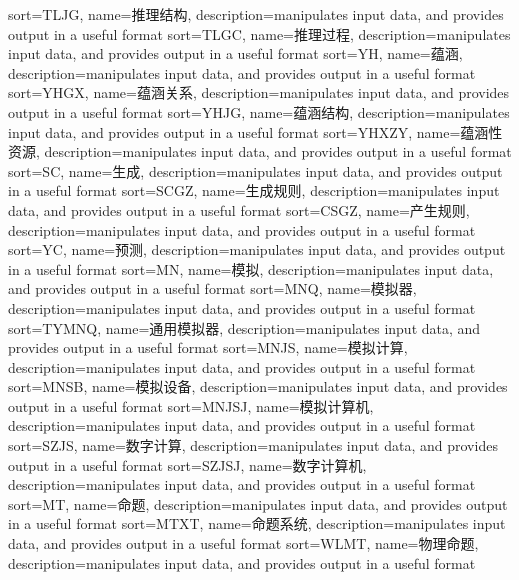 {
  sort=TLJG,
  name=推理结构,
  description={manipulates input data, and provides output in a useful format}
}
{
  sort=TLGC,
  name=推理过程,
  description={manipulates input data, and provides output in a useful format}
}
{
  sort=YH,
  name=蕴涵,
  description={manipulates input data, and provides output in a useful format}
}
{
  sort=YHGX,
  name=蕴涵关系,
  description={manipulates input data, and provides output in a useful format}
}
{
  sort=YHJG,
  name=蕴涵结构,
  description={manipulates input data, and provides output in a useful format}
}
{
  sort=YHXZY,
  name=蕴涵性资源,
  description={manipulates input data, and provides output in a useful format}
}
{
  sort=SC,
  name=生成,
  description={manipulates input data, and provides output in a useful format}
}
{
  sort=SCGZ,
  name=生成规则,
  description={manipulates input data, and provides output in a useful format}
}
{
  sort=CSGZ,
  name=产生规则,
  description={manipulates input data, and provides output in a useful format}
}
{
  sort=YC,
  name=预测,
  description={manipulates input data, and provides output in a useful format}
}
{
  sort=MN,
  name=模拟,
  description={manipulates input data, and provides output in a useful format}
}
{
  sort=MNQ,
  name=模拟器,
  description={manipulates input data, and provides output in a useful format}
}
{
  sort=TYMNQ,
  name=通用模拟器,
  description={manipulates input data, and provides output in a useful format}
}
{
  sort=MNJS,
  name=模拟计算,
  description={manipulates input data, and provides output in a useful format}
}
{
  sort=MNSB,
  name=模拟设备,
  description={manipulates input data, and provides output in a useful format}
}
{
  sort=MNJSJ,
  name=模拟计算机,
  description={manipulates input data, and provides output in a useful format}
}
{
  sort=SZJS,
  name=数字计算,
  description={manipulates input data, and provides output in a useful format}
}
{
  sort=SZJSJ,
  name=数字计算机,
  description={manipulates input data, and provides output in a useful format}
}
{
  sort=MT,
  name=命题,
  description={manipulates input data, and provides output in a useful format}
}
{
  sort=MTXT,
  name=命题系统,
  description={manipulates input data, and provides output in a useful format}
}
{
  sort=WLMT,
  name=物理命题,
  description={manipulates input data, and provides output in a useful format}
}


